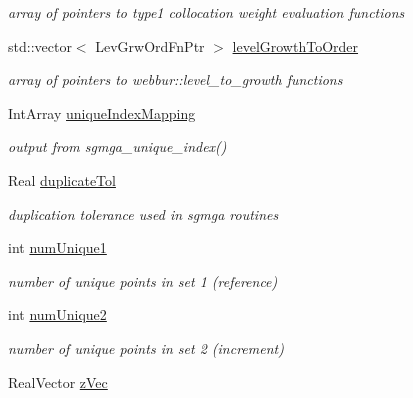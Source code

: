 \begin{DoxyCompactItemize}
\begin{DoxyCompactList}\small\item\em array of pointers to type1 collocation weight evaluation functions \end{DoxyCompactList}\item 
std\+::vector$<$ Lev\+Grw\+Ord\+Fn\+Ptr $>$ \hyperlink{classPecos_1_1CombinedSparseGridDriver_afe808947f36b10cae8286885e1fefdfb}{level\+Growth\+To\+Order}\label{classPecos_1_1CombinedSparseGridDriver_afe808947f36b10cae8286885e1fefdfb}

\begin{DoxyCompactList}\small\item\em array of pointers to webbur\+::level\+\_\+to\+\_\+growth functions \end{DoxyCompactList}\item 
Int\+Array \hyperlink{classPecos_1_1CombinedSparseGridDriver_ae4e534b34b8e3d15b82aeb3de346aadc}{unique\+Index\+Mapping}\label{classPecos_1_1CombinedSparseGridDriver_ae4e534b34b8e3d15b82aeb3de346aadc}

\begin{DoxyCompactList}\small\item\em output from sgmga\+\_\+unique\+\_\+index() \end{DoxyCompactList}\item 
Real \hyperlink{classPecos_1_1CombinedSparseGridDriver_a1a80ea24ac69de0a5a92786ad3c891bd}{duplicate\+Tol}\label{classPecos_1_1CombinedSparseGridDriver_a1a80ea24ac69de0a5a92786ad3c891bd}

\begin{DoxyCompactList}\small\item\em duplication tolerance used in sgmga routines \end{DoxyCompactList}\item 
int \hyperlink{classPecos_1_1CombinedSparseGridDriver_a17af4b7ca6a7725086ccb552a185cea2}{num\+Unique1}\label{classPecos_1_1CombinedSparseGridDriver_a17af4b7ca6a7725086ccb552a185cea2}

\begin{DoxyCompactList}\small\item\em number of unique points in set 1 (reference) \end{DoxyCompactList}\item 
int \hyperlink{classPecos_1_1CombinedSparseGridDriver_a202934a96e748245b16a4b5927466061}{num\+Unique2}\label{classPecos_1_1CombinedSparseGridDriver_a202934a96e748245b16a4b5927466061}

\begin{DoxyCompactList}\small\item\em number of unique points in set 2 (increment) \end{DoxyCompactList}\item 
Real\+Vector \hyperlink{classPecos_1_1CombinedSparseGridDriver_a3488da3050b7533f7679cbd1cc13faa9}{z\+Vec}\label{classPecos_1_1CombinedSparseGridDriver_a3488da3050b7533f7679cbd1cc13faa9}


\end{DoxyCompactItemize}
